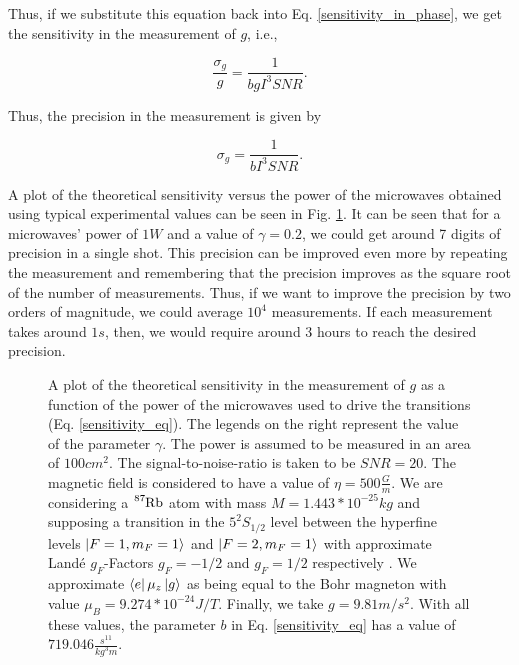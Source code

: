 \documentclass{article}
\begin{document}
Thus, if we substitute this equation back into Eq. \ref{sensitivity_in_phase}, we get the sensitivity in the measurement of $g$, i.e.,

\begin{equation}\label{sensitivity_eq}
    \frac{\sigma_{g}}{g} = \frac{1}{b g I^3 SNR}.
\end{equation}

Thus, the precision in the measurement is given by

\begin{equation}\label{precision_eq}
    \sigma_{g} = \frac{1}{b I^3 SNR}.
\end{equation}

A plot of the theoretical sensitivity versus the power of the microwaves obtained using typical experimental values can be seen in Fig. \ref{precision_vs_power_figure}. It can be seen that for a microwaves' power of $1W$ and a value of $\gamma=0.2$, we could get around 7 digits of precision in a single shot. This precision can be improved even more by repeating the measurement and remembering that the precision improves as the square root of the number of measurements\cite{Bevington_Robinson_Blair_Mallinckrodt_McKay_1993}. Thus, if we want to improve the precision by two orders of magnitude, we could average $10^{4}$ measurements. If each measurement takes around $1s$, then, we would require around $3$ hours to reach the desired precision.

\begin{figure}
    \centering
    
    \caption{A plot of the theoretical sensitivity in the measurement of $g$ as a function of the power of the microwaves used to drive the transitions (Eq. \ref{sensitivity_eq}). The legends on the right represent the value of the parameter $\gamma$. The power is assumed to be measured in an area of $100cm^2$. The signal-to-noise-ratio is taken to be $SNR=20$. The magnetic field is considered to have a value of $\eta = 500 \frac{G}{m}$. We are considering a $\ce{^{87}_{}Rb}$ atom with mass $M=1.443*10^{-25}kg$ and supposing a transition in the $5^{2}S_{1/2}$ level between the hyperfine levels $\ket{F=1, m_{F}=1}$ and $\ket{F=2, m_{F}=1}$ with approximate Landé $g_{F}$-Factors $g_{F}=-1/2$ and $g_{F}=1/2$ respectively \cite{Steck2010}. We approximate $\bra{e} \mu_{z} \ket{g}$ as being equal to the Bohr magneton with value $\mu_{B}=9.274*10^{-24}J/T$. Finally, we take $g=9.81 m/s^2$. With all these values, the parameter $b$ in Eq. \ref{sensitivity_eq} has a value of $719.046 \frac{s^{11}}{kg^{3}m}$.}
    \label{precision_vs_power_figure}
\end{figure}
\end{document}
